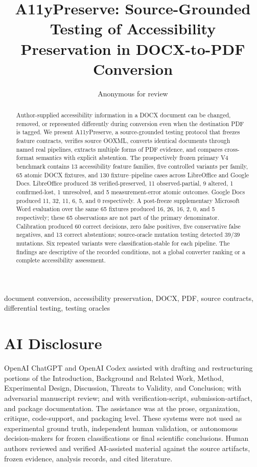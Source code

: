 \documentclass[conference]{IEEEtran}
\title{A11yPreserve: Source-Grounded Testing of Accessibility Preservation in DOCX-to-PDF Conversion}
\author{Anonymous for review}
\begin{document}
\maketitle

\begin{abstract}
Author-supplied accessibility information in a DOCX document can be changed, removed, or represented differently during conversion even when the destination PDF is tagged. We present A11yPreserve, a source-grounded testing protocol that freezes feature contracts, verifies source OOXML, converts identical documents through named real pipelines, extracts multiple forms of PDF evidence, and compares cross-format semantics with explicit abstention. The prospectively frozen primary V4 benchmark contains 13 accessibility feature families, five controlled variants per family, 65 atomic DOCX fixtures, and 130 fixture--pipeline cases across LibreOffice and Google Docs. LibreOffice produced 38 verified-preserved, 11 observed-partial, 9 altered, 1 confirmed-lost, 1 unresolved, and 5 measurement-error atomic outcomes. Google Docs produced 11, 32, 11, 6, 5, and 0 respectively. A post-freeze supplementary Microsoft Word evaluation over the same 65 fixtures produced 16, 26, 16, 2, 0, and 5 respectively; these 65 observations are not part of the primary denominator. Calibration produced 60 correct decisions, zero false positives, five conservative false negatives, and 13 correct abstentions; source-oracle mutation testing detected 39/39 mutations. Six repeated variants were classification-stable for each pipeline. The findings are descriptive of the recorded conditions, not a global converter ranking or a complete accessibility assessment.
\end{abstract}

\begin{IEEEkeywords}
document conversion, accessibility preservation, DOCX, PDF, source contracts, differential testing, testing oracles
\end{IEEEkeywords}










\section*{AI Disclosure}
OpenAI ChatGPT and OpenAI Codex assisted with drafting and restructuring portions of the Introduction, Background and Related Work, Method, Experimental Design, Discussion, Threats to Validity, and Conclusion; with adversarial manuscript review; and with verification-script, submission-artifact, and package documentation. The assistance was at the prose, organization, critique, code-support, and packaging level. These systems were not used as experimental ground truth, independent human validation, or autonomous decision-makers for frozen classifications or final scientific conclusions. Human authors reviewed and verified AI-assisted material against the source artifacts, frozen evidence, analysis records, and cited literature.



\end{document}
